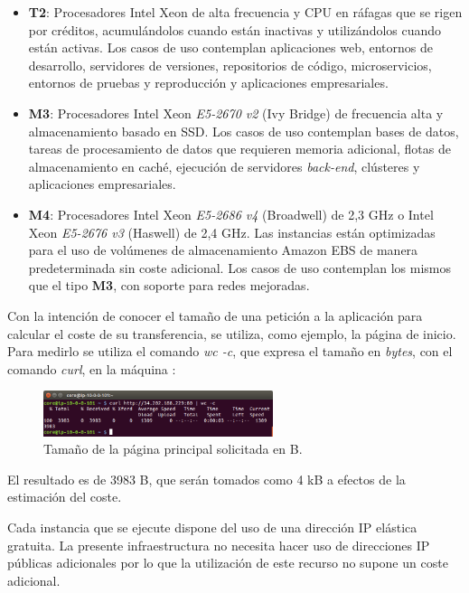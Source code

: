 \begin{itemize}
\item \textbf{T2}: Procesadores Intel Xeon de alta frecuencia y CPU en ráfagas que se rigen por créditos, acumulándolos cuando están inactivas y utilizándolos cuando están activas. Los casos de uso contemplan aplicaciones web, entornos de desarrollo, servidores de versiones, repositorios de código, microservicios, entornos de pruebas y reproducción y aplicaciones empresariales.
\item \textbf{M3}: Procesadores Intel Xeon \textit{E5-2670 v2} (Ivy Bridge) de frecuencia alta y almacenamiento basado en SSD. Los casos de uso contemplan bases de datos, tareas de procesamiento de datos que requieren memoria adicional, flotas de almacenamiento en caché, ejecución de servidores \textit{back-end}, clústeres y aplicaciones empresariales.
\item \textbf{M4}: Procesadores Intel Xeon \textit{E5-2686 v4} (Broadwell) de 2,3 GHz o Intel Xeon \textit{E5-2676 v3} (Haswell) de 2,4 GHz. Las instancias están optimizadas para el uso de volúmenes de almacenamiento Amazon EBS de manera predeterminada sin coste adicional. Los casos de uso contemplan los mismos que el tipo \textbf{M3}, con soporte para redes mejoradas.
\end{itemize}

Con la intención de conocer el tamaño de una petición a la aplicación para calcular el coste de su transferencia, se utiliza, como ejemplo, la página de inicio. Para medirlo se utiliza el comando \textit{wc -c}, que expresa el tamaño en \textit{bytes}, con el comando \textit{curl}, en la máquina :

\begin{figure}[H]
\centering
\includegraphics[width=0.6\textwidth]{images/figures/curl-wc.png}
\caption{Tamaño de la página principal solicitada en B.}
\end{figure}

El resultado es de 3983 B, que serán tomados como 4 kB a efectos de la estimación del coste.

Cada instancia que se ejecute dispone del uso de una dirección IP elástica gratuita. La presente infraestructura no necesita hacer uso de direcciones IP públicas adicionales por lo que la utilización de este recurso no supone un coste adicional.

